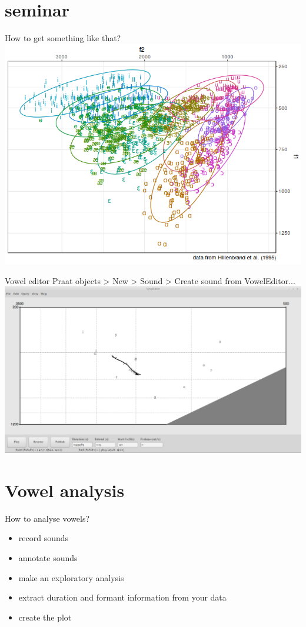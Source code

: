 \section{seminar}
\begin{frame}{How to get something like that?}
\includegraphics[width=\linewidth]{03-vowel-chart.png}
\end{frame}

\begin{frame}{Vowel editor}
Praat objects > New > Sound > Create sound from VowelEditor...
\includegraphics[width=\linewidth]{04-vowel-editor.png}
\end{frame}


\section{Vowel analysis}
\begin{frame}{How to analyse vowels?}
\begin{itemize}
\item record sounds
\item annotate sounds
\item make an exploratory analysis
\item extract duration and formant information from your data
\item create the plot
\end{itemize}
\end{frame}

